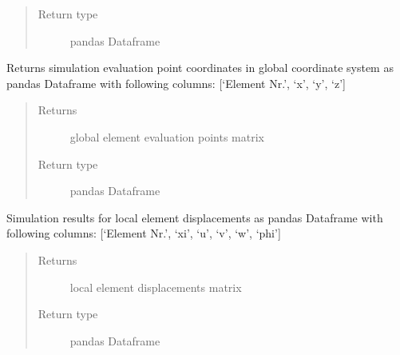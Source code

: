 \documentclass[letterpaper,10pt,english]{sphinxmanual}
\begin{document}
\begin{fulllineitems}
\begin{fulllineitems}
\begin{quote}
\begin{description}
\item[{Return type}] \leavevmode
pandas Dataframe

\end{description}\end{quote}

\end{fulllineitems}


\begin{fulllineitems}
\label{\detokenize{api:beamon.simulation.Simulation.global_element_evaluation_points}}
Returns simulation evaluation point coordinates in global coordinate system
as pandas Dataframe with following columns:
{[}‘Element Nr.’, ‘x’, ‘y’, ‘z’{]}
\begin{quote}\begin{description}
\item[{Returns}] \leavevmode
global element evaluation points matrix

\item[{Return type}] \leavevmode
pandas Dataframe

\end{description}\end{quote}

\end{fulllineitems}


\begin{fulllineitems}
\label{\detokenize{api:beamon.simulation.Simulation.local_element_displacements}}
Simulation results for local element displacements as pandas Dataframe with following columns:
{[}‘Element Nr.’, ‘xi’, ‘u’, ‘v’, ‘w’, ‘phi’{]}
\begin{quote}\begin{description}
\item[{Returns}] \leavevmode
local element displacements matrix

\item[{Return type}] \leavevmode
pandas Dataframe


\end{description}
\end{quote}
\end{fulllineitems}
\end{fulllineitems}
\end{document}
